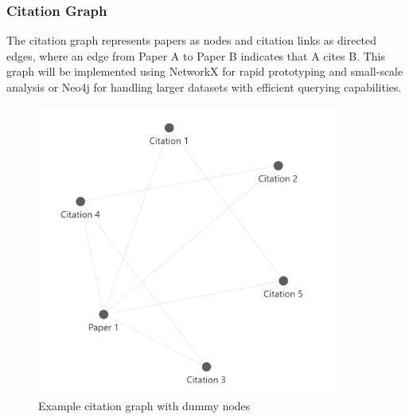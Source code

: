 \documentclass[a4paper,12pt]{article}
\begin{document}
\subsubsection{Citation Graph}
The citation graph represents papers as nodes and citation links as directed edges,
where an edge from Paper A to Paper B indicates that A cites B. This graph will be
implemented using NetworkX for rapid prototyping and small-scale analysis or Neo4j
for handling larger datasets with efficient querying capabilities.
\begin{figure}[H]
    \centering
    \includegraphics[width=10cm]{citationgraph.png}
    \caption{Example citation graph with dummy nodes}
\end{figure}
\end{document}
